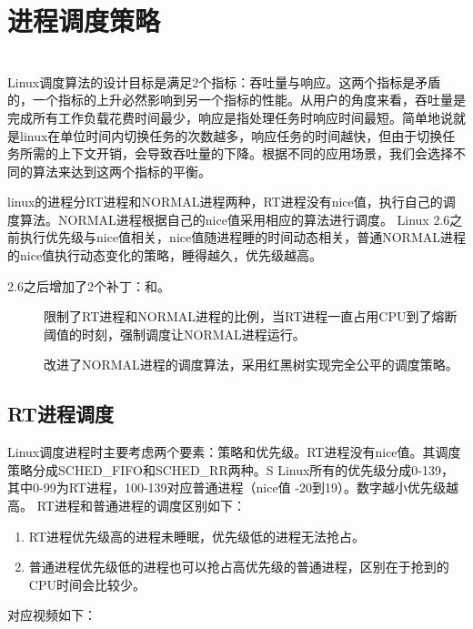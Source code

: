 \chapter{进程调度策略}
~\\\indent Linux调度算法的设计目标是满足2个指标：吞吐量与响应。这两个指标是矛盾的，一个指标的上升必然影响到另一个指标的性能。从用户的角度来看，吞吐量是完成所有工作负载花费时间最少，响应是指处理任务时响应时间最短。简单地说就是linux在单位时间内切换任务的次数越多，响应任务的时间越快，但由于切换任务所需的上下文开销，会导致吞吐量的下降。根据不同的应用场景，我们会选择不同的算法来达到这两个指标的平衡。

linux的进程分RT进程和NORMAL进程两种，RT进程没有nice值，执行自己的调度算法。NORMAL进程根据自己的nice值采用相应的算法进行调度。
Linux 2.6之前执行优先级与nice值相关，nice值随进程睡的时间动态相关，普通NORMAL进程的nice值执行动态变化的策略，睡得越久，优先级越高。

2.6之后增加了2个补丁：{}和{}。
\begin{description}
  \item[{}] 限制了RT进程和NORMAL进程的比例，当RT进程一直占用CPU到了熔断阈值的时刻，强制调度让NORMAL进程运行。
  \item[{}] 改进了NORMAL进程的调度算法，采用红黑树实现完全公平的调度策略。
\end{description}
\clearpage


\section{RT进程调度}
Linux调度进程时主要考虑两个要素：策略和优先级。RT进程没有nice值。其调度策略分成SCHED\_FIFO和SCHED\_RR两种。S
Linux所有的优先级分成0-139，其中0-99为RT进程，100-139对应普通进程（nice值 -20到19）。数字越小优先级越高。
RT进程和普通进程的调度区别如下：
\begin{enumerate}
  \item RT进程优先级高的进程未睡眠，优先级低的进程无法抢占。
  \item 普通进程优先级低的进程也可以抢占高优先级的普通进程，区别在于抢到的CPU时间会比较少。
\end{enumerate}


对应视频如下：
\begin{tcolorbox}[colback=blue!5,colframe=blue!75!black,title=进程调度策略视频]
\end{tcolorbox}

